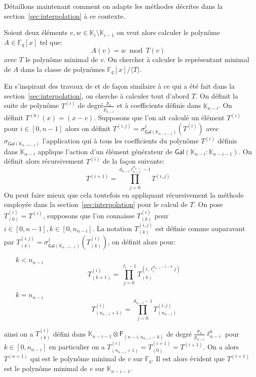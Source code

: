 \documentclass[10pt,a4paper]{book}
\theoremstyle{plain}
\theoremstyle{definition}
\theoremstyle{definition}
\theoremstyle{definition}
\theoremstyle{definition}
\theoremstyle{remark}
\theoremstyle{remark}
\theoremstyle{definition}
\begin{document}
Détaillons maintenant comment on adapte les méthodes décrites dans la 
section~\ref{sec:interpolation} à ce contexte.
 
  
 Soient deux éléments $v,w \in \mathbb{K}_{i} \setminus \mathbb{K}_{i-1}$ on veut
 alors calculer le polynôme $A \in \mathbb{F}_q[x]$ tel que:
\begin{equation}
A(v)=w \bmod T(v)
\end{equation}
avec $T$ le polynôme minimal de $v$. On chercher à calculer le représentant 
minimal de $A$ dans la classe de polynômes $\mathbb{F}_q[x]/ \langle T \rangle$.

 
 En s'inspirant des travaux de \cite{DeFeo10} et de façon similaire à ce qui a 
 été fait dans la section~\ref{sec:interpolation}, on cherche à calculer tout 
 d'abord $T$. On définit la suite de polynôme $T^{(i)}$ de degré$\frac{p_n}{p_{n-i}}$ 
 et à coefficients définis dans $\mathbb{K}_{n-i}$. On définit $T^{(0)}(x)=(x-v)$. 
 Supposons que l'on ait calculé un élément $T^{(i)}$ pour $i \in [0,n-1]$ alors on définit 
 $T^{(i,j)}=\sigma^j_{\mathsf{Gal}(\mathbb{K}_{n-i-1})}(T^{(i)})$ avec
  $\sigma_{\mathsf{Gal}(\mathbb{K}_{n-i-1})}$ 
 l'application qui à tous les coefficients du polynôme $T^{(i)}$ définis dans 
 $\mathbb{K}_{n-i}$ applique l'action d'un élément générateur de 
 $\mathsf{Gal}(\mathbb{K}_{n-i}: \mathbb{K}_{n-i-1})$. 
 On définit alors récursivement $T^{(i)}$ de la façon suivante:
 \begin{equation*}
T^{(i+1)}=\prod_{j=0}^{d_{n-i}\ell_{n-i}^{n_{n-i}}-1}T^{(i,j)}    
\end{equation*}
On peut faire mieux que cela toutefois en appliquant récursivement la méthode 
employée dans la section~\ref{sec:interpolation} pour le calcul de $T$. On pose
$T^{(i)}_{(0)}=T^{(i)}$, supposons que l'on connaisse  $T^{(i)}_{(k)}$ pour 
$i \in [0,n-1], k \in [0,n_{n-i}]$. La notation $T^{(i,j)}_{(k)}$ est définie comme
 auparavant par $T^{(i,j)}_{(k)}=\sigma^j_{\mathsf{Gal}(\mathbb{K}_{n-i-1})}
 (T^{(i)}_{(k)})$, on définit alors pour:
\begin{itemize}
 \item[$k < n_{n-i}$ ]
 \[
T^{(i)}_{(k+1)}=\prod_{j=0}^{\ell_i-1}T^{(i,\ell_{i}^{n_{n-i}-1-k}j)}_{(k)}\]
\item[$k= n_{n-i}$]
\[
T^{(i)}_{(n_{n-i}+1)}=\prod_{j=0}^{d_{n-i}-1}T^{(i,j)}_{(n_{n-i})}
\]
\end{itemize}
ainsi on a $T^{(i)}_{(k)}$ défini dans $\mathbb{K}_{n-i-1} \otimes \mathsf{F}_{(n-i,n_{n-i}-k)}$
de degré $\frac{p_n}{p_{n-i}}\ell_{n-i}^{k}$ pour $k \in [0,n_{n-i}]$ en 
particulier on a $T^{(i)}_{(n_{n-i}+1)}=T^{(i+1)}_{(0)}=T^{(i+1)}$.  
 On a alors $T^{(n+1)}$ qui est le polynôme minimal de $v$ sur $\mathbb{F}_q$.
Il est alors évident que $T^{(i+1)}$ est le polynôme minimal de $v$ sur 
$\mathbb{K}_{n-i-1}$.
\end{document}
